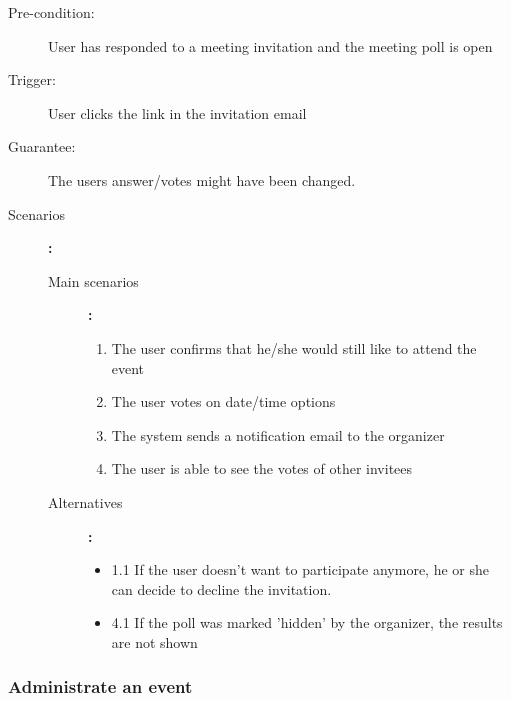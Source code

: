 \begin{description}
	\item[Pre-condition:] User has responded to a meeting invitation and the meeting poll is open
	\item[Trigger:] User clicks the link in the invitation email
	\item[Guarantee:] The users answer/votes might have been changed.
	\item[Scenarios]\textbf{:}\\
				\begin{description}
					\item[Main scenarios]\textbf{:}\\
								\begin{enumerate}
									\item The user confirms that he/she would still like to attend the event
									\item The user votes on date/time options
									\item The system sends a notification email to the organizer
									\item The user is able to see the votes of other invitees
								\end{enumerate}
					\item[Alternatives]\textbf{:}\\
								\begin{itemize}
									\item 1.1 If the user doesn't want to participate anymore, he or she can decide to decline the invitation.
									\item 4.1 If the poll was marked 'hidden' by the organizer, the results are not shown
								\end{itemize}
				\end{description}
\end{description}

\subsubsection{Administrate an event}


